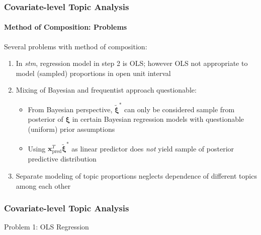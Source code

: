 \documentclass[xcolor=dvipsnames]{beamer}
\begin{document}
\begin{frame}
\frametitle{Covariate-level Topic Analysis}
\framesubtitle{Method of Composition: Problems}
Several problems with method of composition:
\begin{enumerate}
\item In \textit{stm}, regression model in step 2 is OLS; however OLS not appropriate to model (sampled) proportions in open unit interval
\item Mixing of Bayesian and frequentist approach questionable:
\begin{itemize}
\item From Bayesian perspective, $\tilde{\boldsymbol{\xi}}^*$ can only be considered sample from posterior of $\boldsymbol{\xi}$ in certain Bayesian regression models with questionable (uniform) prior assumptions
\item Using $\boldsymbol{x}_{\text{pred}}^T \tilde{\boldsymbol{\xi}}^*$  as linear predictor does \textit{not} yield sample of posterior predictive distribution
\end{itemize}
\item Separate modeling of topic proportions neglects dependence of different topics among each other
\end{enumerate}
\end{frame}

\begin{frame}
\frametitle{Covariate-level Topic Analysis}
\begin{center}
Problem 1: OLS Regression
\end{center}
\end{frame}
\end{document}
